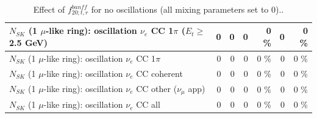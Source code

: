 \begin{table}
\begin{tabular}{| l | r | r | r  r | r  r |}
$N_{SK}$ (1 $\mu$-like ring): oscillation $\nu_e$ CC 1$\pi$ ($E_{t} \geq$ 2.5 GeV) &               0 &               0 &               0 &        0 \%  &               0 &        0 \%  \\ 
\hline
                     $N_{SK}$ (1 $\mu$-like ring): oscillation $\nu_e$ CC 1$\pi$ &               0 &               0 &               0 &        0 \%  &               0 &        0 \%  \\ 
                   $N_{SK}$ (1 $\mu$-like ring): oscillation $\nu_e$ CC coherent &               0 &               0 &               0 &        0 \%  &               0 &        0 \%  \\ 
      $N_{SK}$ (1 $\mu$-like ring): oscillation $\nu_e$ CC other ($\nu_\mu$ app) &               0 &               0 &               0 &        0 \%  &               0 &        0 \%  \\ 
                       $N_{SK}$ (1 $\mu$-like ring): oscillation $\nu_e$  CC all &               0 &               0 &               0 &        0 \%  &               0 &        0 \%  \\ 
\hline
\hline
\end{tabular}
\caption{ Effect of $f_{20; t, r}^{banff}$ for no oscillations (all mixing parameters set to 0).. }
\label{tab:num_banff_ccqeE2_1RmuT_3f_osc_t13:0}
\end{table}
\clearpage
